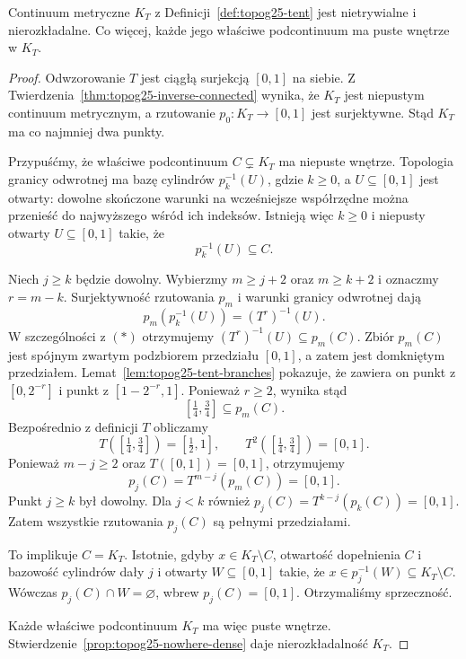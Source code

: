\begin{twierdzenie}
\label{thm:topog25-knaster}
Continuum metryczne \(K_T\)
z Definicji~\ref{def:topog25-tent}
jest nietrywialne i nierozkładalne.
Co więcej, każde jego właściwe
podcontinuum ma puste wnętrze
w \(K_T\).
\end{twierdzenie}
\begin{proof}
Odwzorowanie \(T\) jest ciągłą
surjekcją \([0,1]\) na siebie.
Z Twierdzenia~\ref{thm:topog25-inverse-connected}
wynika, że \(K_T\) jest
niepustym continuum metrycznym,
a rzutowanie \(p_0\colon K_T\to[0,1]\)
jest surjektywne. Stąd \(K_T\)
ma co najmniej dwa punkty.

Przypuśćmy, że właściwe
podcontinuum \(C\subsetneq K_T\)
ma niepuste wnętrze.
Topologia granicy odwrotnej
ma bazę cylindrów
\(p_k^{-1}(U)\), gdzie
\(k\ge0\), a \(U\subseteq[0,1]\)
jest otwarty: dowolne skończone
warunki na wcześniejsze współrzędne
można przenieść do najwyższego
wśród ich indeksów.
Istnieją więc \(k\ge0\)
i niepusty otwarty \(U\subseteq[0,1]\)
takie, że
\[
 p_k^{-1}(U)\subseteq C.
 \tag{*}
\]

Niech \(j\ge k\) będzie dowolny.
Wybierzmy \(m\ge j+2\)
oraz \(m\ge k+2\)
i oznaczmy \(r=m-k\).
Surjektywność rzutowania \(p_m\)
i warunki granicy odwrotnej
dają
\[
 p_m(p_k^{-1}(U))=(T^r)^{-1}(U).
\]
W szczególności z \((*)\)
otrzymujemy
\((T^r)^{-1}(U)\subseteq p_m(C)\).
Zbiór \(p_m(C)\)
jest spójnym zwartym podzbiorem
przedziału \([0,1]\),
a zatem jest domkniętym przedziałem.
Lemat~\ref{lem:topog25-tent-branches}
pokazuje, że zawiera on
punkt z \([0,2^{-r}]\)
i punkt z \([1-2^{-r},1]\).
Ponieważ \(r\ge2\),
wynika stąd
\[
 [\tfrac14,\tfrac34]\subseteq p_m(C).
\]
Bezpośrednio z definicji \(T\)
obliczamy
\[
 T([\tfrac14,\tfrac34])=[\tfrac12,1],
 \qquad
 T^2([\tfrac14,\tfrac34])=[0,1].
\]
Ponieważ \(m-j\ge2\) oraz
\(T([0,1])=[0,1]\),
otrzymujemy
\[
 p_j(C)=T^{m-j}(p_m(C))=[0,1].
\]
Punkt \(j\ge k\) był dowolny.
Dla \(j<k\) również
\(p_j(C)=T^{k-j}(p_k(C))=[0,1]\).
Zatem wszystkie rzutowania
\(p_j(C)\) są pełnymi przedziałami.

To implikuje \(C=K_T\).
Istotnie, gdyby \(x\in K_T\setminus C\),
otwartość dopełnienia \(C\)
i bazowość cylindrów dały
\(j\) i otwarty \(W\subseteq[0,1]\)
takie, że
\(x\in p_j^{-1}(W)\subseteq K_T\setminus C\).
Wówczas \(p_j(C)\cap W=\varnothing\),
wbrew \(p_j(C)=[0,1]\).
Otrzymaliśmy sprzeczność.

Każde właściwe podcontinuum
\(K_T\) ma więc puste wnętrze.
Stwierdzenie~\ref{prop:topog25-nowhere-dense}
daje nierozkładalność \(K_T\).
\end{proof}

